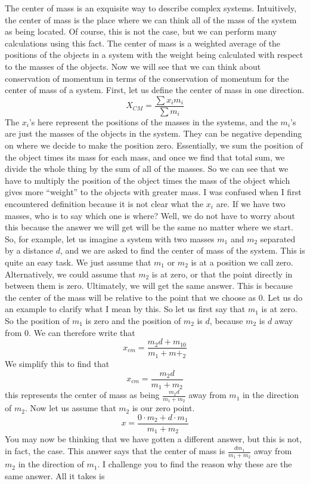 \newline
The center of mass is an exquisite way to describe complex systems. Intuitively, the center of mass is the place where we can think all of the mass of the system as being located. Of course, this is not the case, but we can perform many calculations using this fact. The center of mass is a weighted average of the positions of the objects in a system with the weight being calculated with respect to the masses of the objects. Now we will see that we can think about conservation of momentum in terms of the conservation of momentum for the center of mass of a system. First, let us define the center of mass in one direction. \begin{equation}X_{CM}= \frac{\sum x_i m_i}{\sum m_i}\end{equation} The $x_i$’s here represent the positions of the masses in the systems, and the $m_i$’s are just the masses of the objects in the system. They can be negative depending on where we decide to make the position zero. Essentially, we sum the position of the object times its mass for each mass, and once we find that total sum, we divide the whole thing by the sum of all of the masses. So we can see that we have to multiply the position of the object times the mass of the object which gives more “weight” to the objects with greater mass. I was confused when I first encountered definition because it is not clear what the $x_i$ are. If we have two masses, who is to say which one is where? Well, we do not have to worry about this because the answer we will get will be the same no matter where we start. So, for example, let us imagine a system with two masses $m_1$ and $m_2$ separated by a distance $d$, and we are asked to find the center of mass of the system. This is quite an easy task. We just assume that $m_1$ or $m_2$ is at a position we call zero. Alternatively, we could assume that $m_2$ is at zero, or that the point directly in between them is zero. Ultimately, we will get the same answer. This is because the center of the mass will be relative to the point that we choose as 0. Let us do an example to clarify what I mean by this. So let us first say that $m_1$ is at zero. So the position of $m_1$ is zero and the position of $m_2$ is $d$, because $m_2$ is $d$ away from 0. We can therefore write that $$x_{cm} = \frac{m_2d+ m_10}{m_1+m+_2}$$ We simplify this to find that $$x_{cm} =\frac{m_2 d}{m_1+m_2}$$ this represents the center of mass as being $\frac{m_2 d}{m_1+m_2}$ away from $m_1$ in the direction of $m_2$. Now let us assume that $m_2$ is our zero point. $$x=\frac{0\cdot m_2+d\cdot m_1}{m_1+m_2}$$ You may now be thinking that we have gotten a different answer, but this is not, in fact, the case. This answer says that the center of mass is $\frac{dm_1}{m_1+m_2}$ away from $m_2$ in the direction of $m_1$. I challenge you to find the reason why these are the same answer. All it takes is 